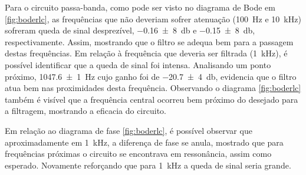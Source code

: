   Para o circuito passa-banda, como pode ser visto no diagrama de Bode em \ref{fig:boderlc}, as frequências que não deveriam sofrer  atenuação (\SI{100}{\hertz} e \SI{10}{\kilo\hertz}) sofreram queda de sinal desprezível, \SI[scientific-notation=false]{-0,16(8)}{\decibel} e \SI[scientific-notation=false]{-0,15(8)}{\decibel}, respectivamente. Assim, mostrando que o filtro se adequa bem para a passagem destas frequências. Em relação à frequência que deveria ser filtrada (\SI{1}{\kilo\hertz}), é possível identificar que a queda de sinal foi intensa. Analisando um ponto próximo, \SI{1047,6(1)}{\hertz} cujo ganho foi de \SI{-20,7(4)}{\decibel}, evidencia que o filtro atua bem nas proximidades desta frequência. Observando o diagrama \ref{fig:boderlc} também é visível que a frequência central ocorreu bem próximo do desejado para a filtragem, mostrando a eficacia do circuito.
  \par
  Em relação ao diagrama de fase \ref{fig:boderlc}, é possível observar que aproximadamente em \SI{1}{\kilo\hertz}, a diferença de fase se anula, mostrado que para frequências próximas o circuito se encontrava em ressonância, assim como esperado. Novamente reforçando que para \SI{1}{\kilo\hertz} a queda de sinal seria grande.
